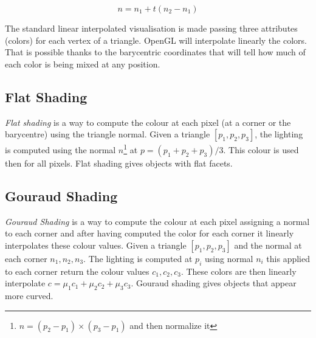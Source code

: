 $$ n = n_1 + t (n_2 - n_1)$$


The standard linear interpolated visualisation is made passing three attributes (colors) for each vertex of a triangle. OpenGL will interpolate linearly the colors. That is possible thanks to the barycentric coordinates that will tell how much of each color is being mixed at any position.


\subsection{Flat Shading}
\textit{Flat shading} is a way to compute the colour at each pixel (at a corner or the barycentre) using the triangle normal.
Given a triangle $[p_1, p_2, p_3]$, the lighting is computed using the normal $n$\footnote{$ \widehat{n} = (p_2 - p_1) \times (p_3 - p_1)$ and then normalize it} at $p= (p_1 + p_2 + p_3)/3$. This colour is used then for all pixels. Flat shading gives objects with flat facets.
\cite{SLIDE:ICORSI}

\subsection{Gouraud Shading}
\textit{Gouraud Shading} is a way to compute the colour at each pixel assigning a normal to each corner and after having computed the color for each corner it linearly interpolates these colour values.
Given a triangle $[p_1, p_2, p_3]$ and the normal at each corner $n_1, n_2, n_3$.
The lighting is computed at $p_i$ using normal $n_i$ this applied to each corner return the colour values $c_1, c_2, c_3$.
These colors are then linearly interpolate $c = {\mu}_1 c_1 + {\mu}_2 c_2 + {\mu}_3 c_3$. Gouraud shading gives objects that appear more curved. \cite{SLIDE:ICORSI}


